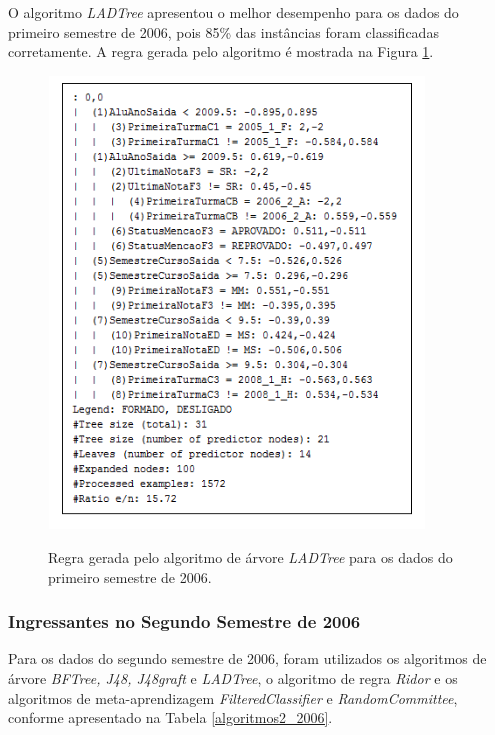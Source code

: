 O algoritmo \textit{LADTree} apresentou o melhor desempenho para os dados do primeiro semestre de 2006, pois 85\% das instâncias foram classificadas corretamente. A regra gerada pelo algoritmo é mostrada na Figura \ref{regra1_2006}. 


 \begin{figure}[!h]
 	\centering
 	{\includegraphics[width=10cm, height=12cm]{images/regra1_2006}}
 	\caption {Regra gerada pelo algoritmo de árvore \textit{LADTree} para os dados do primeiro semestre de 2006.}
 	\label{regra1_2006}
 \end{figure}

\subsubsection{Ingressantes no Segundo Semestre de 2006}

Para os dados do segundo semestre de 2006, foram utilizados os algoritmos de árvore \textit{BFTree, J48, J48graft} e \textit{LADTree}, o algoritmo de regra \textit{Ridor} e os algoritmos de meta-aprendizagem \textit{FilteredClassifier} e \textit{RandomCommittee}, conforme apresentado na Tabela \ref{algoritmos2_2006}.

